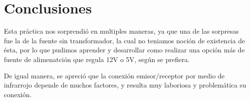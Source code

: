\documentclass[]{article}
\begin{document}
\section{Conclusiones}

Esta práctica nos sorprendió en multiples maneras, ya que una de las sorpresas fue la de la fuente sin transformador, la cual no teniamos noción de existencia de ésta,
por lo que pudimos aprender y desarrollar como realizar una opción más de fuente de alimenatción que regula 12V o 5V, según se prefiera.

De igual manera, se apreció que la conexión emisor/receptor por medio de infrarrojo depende de muchos factores, y resulta muy laboriosa y problemática su conexión.


\end{document}

